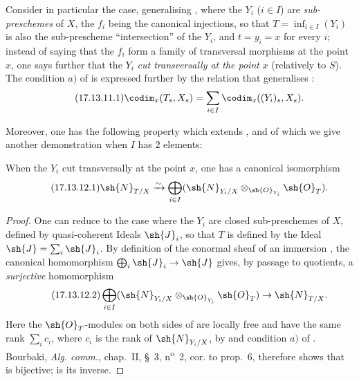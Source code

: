 \begin{env}[17.13.11]
\label{IV.17.13.11}
Consider in particular the case, generalising , where the $Y_i$ ($i\in I$) are \emph{sub-preschemes} of $X$, the $f_i$ being the canonical injections, so that $T=\inf_{i\in I}(Y_i)$ is also the sub-prescheme ``intersection'' of the $Y_i$, and $t=y_i=x$ for every $i$; instead of saying that the $f_i$ form a family of transversal morphisms at the point $x$, one says further that the $Y_i$ \emph{cut transversally at the point} $x$ (relatively to $S$).
The condition $a)$ of  is expressed further by the relation that generalises :
\[
\label{IV.17.13.11.1}
\tag{17.13.11.1}
\codim_x(T_s,X_s) = \sum_{i\in I}\codim_x((Y_i)_s,X_s).
\]

Moreover, one has the following property which extends , and of which we give another demonstration when $I$ has $2$ elements:
\end{env}

\begin{corollary}[17.13.12]
\label{IV.17.13.12}
When the $Y_i$ cut transversally at the point $x$, one has a canonical isomorphism
\[
\label{IV.17.13.12.1}
\tag{17.13.12.1}
\sh{N}_{T/X} \xrightarrow{\sim} \bigoplus_{i\in I}(\sh{N}_{Y_i/X}\otimes_{\sh{O}_{Y_i}}\sh{O}_T).
\]
\end{corollary}

\begin{proof}
One can reduce to the case where the $Y_i$ are closed sub-preschemes of $X$, defined by quasi-coherent Ideals $\sh{J}_i$, so that $T$ is defined by the Ideal $\sh{J}=\sum_i\sh{J}_i$.
By definition of the conormal sheaf of an immersion , the canonical homomorphism $\bigoplus_i\sh{J}_i\to\sh{J}$ gives, by passage to quotients, a \emph{surjective} homomorphism
\[
\label{IV.17.13.12.2}
\tag{17.13.12.2}
\bigoplus_{i\in I}(\sh{N}_{Y_i/X}\otimes_{\sh{O}_{Y_i}}\sh{O}_T) \to \sh{N}_{T/X}.
\]
Here the $\sh{O}_T$-modules on both sides of  are locally free and have the same rank $\sum_i c_i$, where $c_i$ is the rank of $\sh{N}_{Y_i/X}$, by  and condition $a)$ of .
Bourbaki, \emph{Alg. comm.}, chap.~II, \S~3, n\textsuperscript{o}~2, cor. to prop.~6, therefore shows that  is bijective;  is its inverse.
\end{proof}

